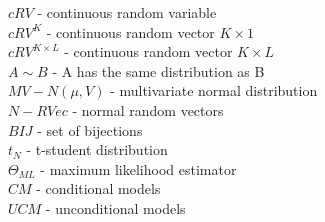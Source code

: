 \documentclass[preview, border=1pt, convert={outext=.png}]{standalone}
\begin{document}
$cRV$ - continuous random variable \\
$cRV^{K}$ - continuous random vector $K \times 1$ \\
$cRV^{K\times L}$ - continuous random vector $K \times L$ \\
$A\sim B$ - A has the same distribution as B \\
$MV-N(\mu, V)$ - multivariate normal distribution \\
$N-RVec$ - normal random vectors \\
$BIJ$ - set of bijections \\
$t_{N}$ - t-student distribution \\
$\Theta_{ML}$ - maximum likelihood estimator \\
$CM$ - conditional models \\
$UCM$ - unconditional models
\end{document}

